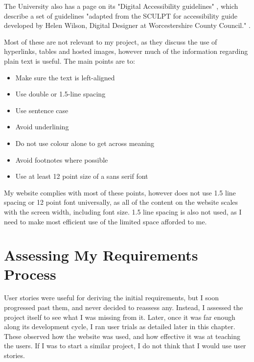 \documentclass{l4proj}
\begin{document}
The University also has a page on its "Digital Accessibility guidelines" \citep{digital_accessibility}, which describe a set of guidelines "adapted from the SCULPT for accessibility guide developed by Helen Wilson, Digital Designer at Worcestershire County Council." \citep{sculpt}.

Most of these are not relevant to my project, as they discuss the use of hyperlinks, tables and hosted images, however much of the information regarding plain text is useful.  The main points are to: 

\begin{itemize}
    \item Make sure the text is left-aligned

    \item Use double or 1.5-line spacing

    \item Use sentence case

    \item Avoid underlining

    \item Do not use colour alone to get across meaning

    \item Avoid footnotes where possible

    \item Use at least 12 point size of a sans serif font
\end{itemize}

My website complies with most of these points, however does not use 1.5 line spacing or 12 point font universally, as all of the content on the website scales with the screen width, including font size.  1.5 line spacing is also not used, as I need to make most efficient use of the limited space afforded to me.

\section{Assessing My Requirements Process}

User stories were useful for deriving the initial requirements, but I soon progressed past them, and never decided to reassess any.  Instead, I assessed the project itself to see what I was missing from it.  Later, once it was far enough along its development cycle, I ran user trials as detailed later in this chapter.  These observed how the website was used, and how effective it was at teaching the users.  If I was to start a similar project, I do not think that I would use user stories.
\end{document}
